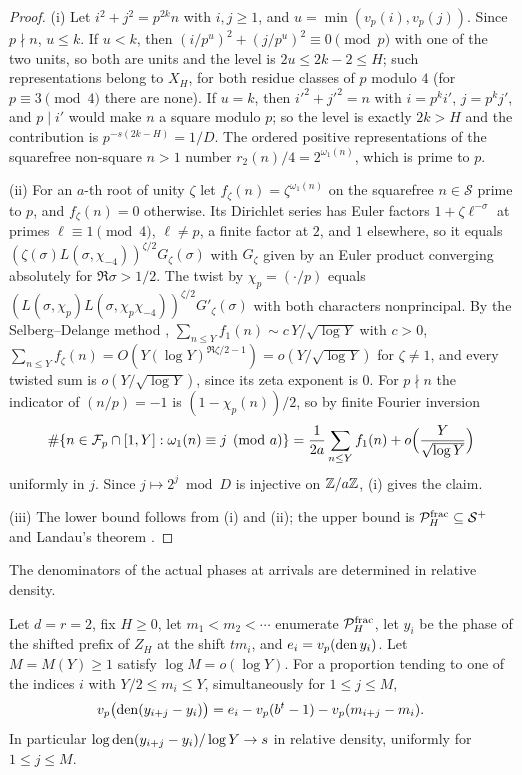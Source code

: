 \documentclass[11pt]{article}
\begin{document}
\begin{proof}
(i) Let $i^2+j^2=p^{2k}n$ with $i,j\ge1$, and $u=\min(v_p(i),v_p(j))$. Since $p\nmid n$, $u\le k$. If $u<k$, then
$(i/p^u)^2+(j/p^u)^2\equiv0\pmod p$ with one of the two units, so both are units and the level is $2u\le2k-2\le H$;
such representations belong to $X_H$, for both residue classes of $p$ modulo $4$ (for $p\equiv3\pmod4$ there are
none). If $u=k$, then $i'^2+j'^2=n$ with $i=p^ki'$, $j=p^kj'$, and $p\mid i'$ would make $n$ a square modulo $p$; so the
level is exactly $2k>H$ and the contribution is $p^{-s(2k-H)}=1/D$. The ordered positive representations of the
squarefree non-square $n>1$ number $r_2(n)/4=2^{\omega_1(n)}$, which is prime to $p$.

(ii) For an $a$-th root of unity $\zeta$ let $f_\zeta(n)=\zeta^{\omega_1(n)}$ on the squarefree $n\in\mathcal S$ prime to $p$,
and $f_\zeta(n)=0$ otherwise. Its Dirichlet series has Euler factors $1+\zeta\ell^{-\sigma}$ at primes
$\ell\equiv1\pmod4$, $\ell\ne p$, a finite factor at $2$, and $1$ elsewhere, so it equals
$(\zeta(\sigma)L(\sigma,\chi_{-4}))^{\zeta/2}G_\zeta(\sigma)$ with $G_\zeta$ given by an Euler product converging absolutely for
$\Re\sigma>1/2$. The twist by $\chi_p=(\cdot/p)$ equals $(L(\sigma,\chi_p)L(\sigma,\chi_p\chi_{-4}))^{\zeta/2}G'_\zeta(\sigma)$ with both
characters nonprincipal. By the Selberg--Delange method \cite[Chapter~II.5]{Tenenbaum15}, $\sum_{n\le Y}f_1(n)\sim
c\,Y/\sqrt{\log Y}$ with $c>0$, $\sum_{n\le Y}f_\zeta(n)=O(Y(\log Y)^{\Re\zeta/2-1})=o(Y/\sqrt{\log Y})$ for $\zeta\ne1$, and every
twisted sum is $o(Y/\sqrt{\log Y})$, since its zeta exponent is $0$. For $p\nmid n$ the indicator of $(n/p)=-1$ is
$(1-\chi_p(n))/2$, so by finite Fourier inversion
\[
\#\{n\in\mathcal F_p\cap[1,Y]:\omega_1(n)\equiv j\pmod a\}=\frac1{2a}\sum_{n\le Y}f_1(n)+o\Bigl(\frac Y{\sqrt{\log Y}}\Bigr)
\]
uniformly in $j$. Since $j\mapsto2^j\bmod D$ is injective on $\mathbb Z/a\mathbb Z$, (i) gives the claim.

(iii) The lower bound follows from (i) and (ii); the upper bound is $\mathcal P_H^{\rm frac}\subseteq\mathcal S^+$ and
Landau's theorem \cite{Landau08}.
\end{proof}

The denominators of the actual phases at arrivals are determined in relative density.

\begin{proposition}\label{prop:aggregate}
Let $d=r=2$, fix $H\ge0$, let $m_1<m_2<\cdots$ enumerate $\mathcal P_H^{\rm frac}$, let $y_i$ be the phase of the shifted
prefix of $Z_H$ at the shift $tm_i$, and $e_i=v_p(\operatorname{den} y_i)$. Let $M=M(Y)\ge1$ satisfy $\log M=o(\log Y)$. For a
proportion tending to one of the indices $i$ with $Y/2\le m_i\le Y$, simultaneously for $1\le j\le M$,
\[
v_p\bigl(\operatorname{den}(y_{i+j}-y_i)\bigr)=e_i-v_p(b^t-1)-v_p(m_{i+j}-m_i).
\]
In particular $\log\operatorname{den}(y_{i+j}-y_i)/\log Y\to s$ in relative density, uniformly for $1\le j\le M$.
\end{proposition}
\end{document}
